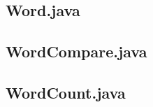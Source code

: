 \documentclass[a4paper,11pt]{ltjsarticle}
\begin{document}
\subsection*{Word.java}


\subsection*{WordCompare.java}


\subsection*{WordCount.java}

\end{document}
